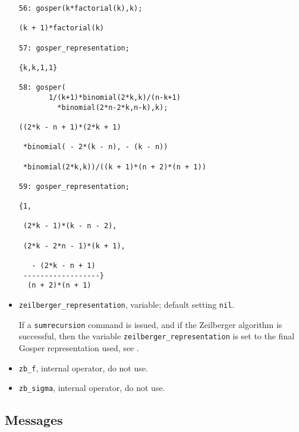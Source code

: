 \begin{itemize}
{\begin{verbatim}
56: gosper(k*factorial(k),k);

(k + 1)*factorial(k)

57: gosper_representation;

{k,k,1,1}

58: gosper(
       1/(k+1)*binomial(2*k,k)/(n-k+1)
         *binomial(2*n-2*k,n-k),k);

((2*k - n + 1)*(2*k + 1)

 *binomial( - 2*(k - n), - (k - n))

 *binomial(2*k,k))/((k + 1)*(n + 2)*(n + 1))

59: gosper_representation;

{1,

 (2*k - 1)*(k - n - 2),

 (2*k - 2*n - 1)*(k + 1),

   - (2*k - n + 1)
 ------------------}
  (n + 2)*(n + 1)
\end{verbatim}
}\noindent
\item
\texttt{zeilberger\_representation}, variable; default setting \texttt{nil}.

If a \texttt{sumrecursion} command is issued, and if the Zeilberger
algorithm is successful, then the variable
\texttt{zeilberger\_representation} is set to the final Gosper
representation used, see \cite{Koornwinder:93}.
\item
  \texttt{zb\_f}, internal operator, do not use.
\item
  \texttt{zb\_sigma}, internal operator, do not use.
\end{itemize}

\subsection{Messages}

